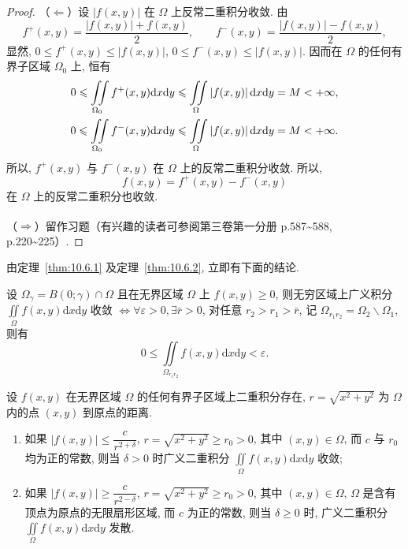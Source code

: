 \begin{proof}
（$\Leftarrow$）设 $\left| f(x,y) \right|$ 在 $\Omega$ 上反常二重积分收敛. 由
\[
f^{+}(x,y) = \frac{\left| f(x,y) \right| + f(x,y)}{2}, \qquad
f^{-}(x,y) = \frac{\left| f(x,y) \right| - f(x,y)}{2},
\]
显然, $0 \leqslant f^{+}(x,y) \leqslant \left| f(x,y) \right|$,
$0 \leqslant f^{-}(x,y) \leqslant \left| f(x,y) \right|$.
因而在 $\Omega$ 的任何有界子区域 $\Omega_{0}$ 上, 恒有
\[
\begin{aligned}
0 \leqslant \iint\limits_{\Omega_{0}} f^{+}(x,y) \mathrm{d}x\mathrm{d}y
&\leqslant \iint\limits_{\Omega} \left| f(x,y) \right| \mathrm{d}x\mathrm{d}y = M < +\infty, \notag\\
0 \leqslant \iint\limits_{\Omega_{0}} f^{-}(x,y) \mathrm{d}x\mathrm{d}y
&\leqslant \iint\limits_{\Omega} \left| f(x,y) \right| \mathrm{d}x\mathrm{d}y = M < +\infty. \notag
\end{aligned}
\]
所以, $f^{+}(x,y)$ 与 $f^{-}(x,y)$ 在 $\Omega$ 上的反常二重积分收敛. 所以,
\[
f(x,y) = f^{+}(x,y) - f^{-}(x,y)
\]
在 $\Omega$ 上的反常二重积分也收敛.

（$\Rightarrow$）留作习题（有兴趣的读者可参阅\textsuperscript{\cite{fichtenholz1957}}第三卷第一分册
p.587\textasciitilde{}588, p.220\textasciitilde{}225）.
\end{proof}

由定理~\ref{thm:10.6.1} 及定理~\ref{thm:10.6.2}, 立即有下面的结论.

\begin{theorem}
\label{thm:10.6.4}
设 $\Omega_{\gamma} = B(0; \gamma) \cap \Omega$ 且在无界区域 $\Omega$ 上 $f(x,y) \geqslant 0$, 则无穷区域上广义积分
$\iint\limits_{\Omega} f(x,y) \mathrm{d}x\mathrm{d}y$ 收敛
$\Leftrightarrow \forall \varepsilon > 0, \exists \bar{r} > 0$,
对任意 $r_{2} > r_{1} > \bar{r}$, 记 $\Omega_{r_{1}r_{2}} = \Omega_{2} \backslash \Omega_{1}$, 则有
\[
0 \leqslant \iint\limits_{\Omega_{r_{1}r_{2}}} f(x,y) \mathrm{d}x\mathrm{d}y < \varepsilon.
\]
\end{theorem}

\begin{theorem}
\label{thm:10.6.5}
设 $f(x, y)$ 在无界区域 $\Omega$ 的任何有界子区域上二重积分存在,
$r = \sqrt{x^{2} + y^{2}}$ 为 $\Omega$ 内的点 $(x, y)$ 到原点的距离.
\begin{enumerate}
\item[(1)] 如果 $\left| f(x,y) \right| \leqslant \dfrac{c}{r^{2+\delta}}$,
$r = \sqrt{x^{2} + y^{2}} \geqslant r_{0} > 0$, 其中 $(x, y) \in \Omega$,
而 $c$ 与 $r_{0}$ 均为正的常数, 则当 $\delta > 0$ 时广义二重积分
$\iint\limits_{\Omega} f(x,y) \mathrm{d}x\mathrm{d}y$ 收敛;
\item[(2)] 如果 $\left| f(x,y) \right| \geqslant \dfrac{c}{r^{2-\delta}}$,
$r = \sqrt{x^{2} + y^{2}} \geqslant r_{0} > 0$, 其中 $(x, y) \in \Omega$,
$\Omega$ 是含有顶点为原点的无限扇形区域, 而 $c$ 为正的常数,
则当 $\delta \geqslant 0$ 时, 广义二重积分
$\iint\limits_{\Omega} f(x,y) \mathrm{d}x\mathrm{d}y$ 发散.
\end{enumerate}
\end{theorem}

